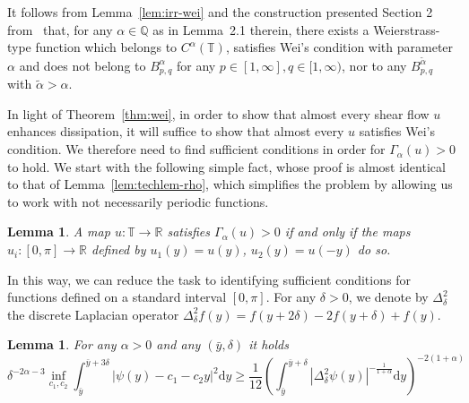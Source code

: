 \documentclass[11pt,oneside,reqno]{amsart}
\newcommand{\mathd}{\mathrm{d}}
\newtheorem{lemma}[theorem]{Lemma}
\numberwithin{equation}{section}
\begin{document}
\begin{remark}
  It follows from Lemma~\ref{lem:irr-wei} and the construction presented
  Section 2 from~{\cite{colombozelati}} that, for any $\alpha \in \mathbb{Q}$
  as in Lemma~2.1 therein, there exists a Weierstrass-type function which
  belongs to $C^{\alpha} (\mathbb{T})$, satisfies Wei's condition with
  parameter $\alpha$ and does not belong to $B^{\alpha}_{p, q}$ for any $p \in
  [1, \infty], q \in [1, \infty)$, nor to any $B^{\tilde{\alpha}}_{p, q}$ with
  $\tilde{\alpha} > \alpha$.
\end{remark}

In light of Theorem~\ref{thm:wei}, in order to show that almost every shear
flow $u$ enhances dissipation, it will suffice to show that almost every $u$
satisfies Wei's condition. We therefore need to find sufficient conditions in
order for $\Gamma_{\alpha} (u) > 0$ to hold. We start with the following
simple fact, whose proof is almost identical to that of
Lemma~\ref{lem:techlem-rho}, which simplifies the problem by
allowing us to work with not necessarily periodic functions.

\begin{lemma}
  \label{lem:wei-techlem0}A map $u : \mathbb{T} \rightarrow \mathbb{R}$
  satisfies $\Gamma_{\alpha} (u) > 0$ if and only if the maps $u_i : [0, \pi]
  \rightarrow \mathbb{R}$ defined by $u_1 (y) = u
  (y)$, $u_2 (y) = u (-y)$ do
  so.
\end{lemma}

In this way, we can reduce the task to identifying sufficient conditions for
functions defined on a standard interval $[0, \pi]$. For any $\delta > 0$, we
denote by $\Delta^2_{\delta}$ the discrete Laplacian operator
$\Delta^2_{\delta} f (y) = f (y + 2 \delta) - 2 f (y + \delta) + f (y)$.

\begin{lemma}
  \label{lem:wei-techlem-1}For any $\alpha > 0$ and any $(\bar{y}, \delta)$ it
  holds
  \begin{equation}
      \delta^{- 2 \alpha - 3} \inf_{c_1, c_2} \int_{\bar{y}}^{\bar{y} + 3
      \delta} | \psi (y) - c_1 - c_2 y |^2 \mathd y
      \geqslant \frac{1}{12}  \left( \int_{\bar{y}}^{\bar{y} +
      \delta} | \Delta_{\delta}^2 \psi (y) |^{- \frac{1}{1 + \alpha}} \mathd y
      \right)^{- 2 (1 + \alpha)}\label{eq:wei-basic-ineq}
  \end{equation}
  
\end{lemma}
\end{document}
